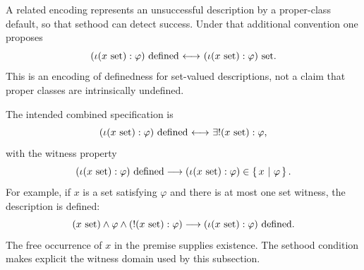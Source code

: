 A related encoding represents an unsuccessful description by a proper-class
default, so that sethood can detect success. Under that additional convention
one proposes
\[
(\iota (x\mathrm{\ set}): \varphi) \mathrm{\ defined}
{\ \longleftrightarrow\ }
(\iota (x\mathrm{\ set}): \varphi) \mathrm{\ set}.
\]
This is an encoding of definedness for set-valued descriptions, not a claim
that proper classes are intrinsically undefined.

The intended combined specification is
\[
(\iota (x\mathrm{\ set}): \varphi) \mathrm{\ defined}
{\ \longleftrightarrow\ }
\exists! (x\mathrm{\ set}):\varphi,
\]
with the witness property
\[
(\iota (x\mathrm{\ set}): \varphi) \mathrm{\ defined}
\longrightarrow
(\iota (x\mathrm{\ set}): \varphi) \in \left\{\,x\ \middle|\ \varphi\,\right\}.
\]
For example, if $x$ is a set satisfying $\varphi$ and there is at most one set
witness, the description is defined:
\[
(x\mathrm{\ set})\land\varphi\land (!(x\mathrm{\ set}):\varphi)
\longrightarrow
(\iota (x\mathrm{\ set}): \varphi) \mathrm{\ defined}.
\]
The free occurrence of $x$ in the premise supplies existence. The sethood
condition makes explicit the witness domain used by this subsection.


